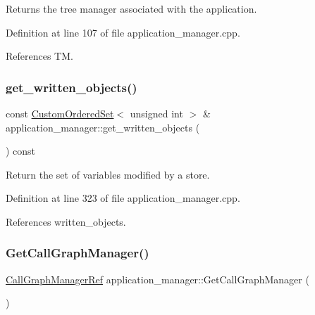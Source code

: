 Returns the tree manager associated with the application. 



Definition at line 107 of file application\+\_\+manager.\+cpp.



References TM.

\mbox{\label{classapplication__manager_a4990ab2af03c641da7b8dad08706208c}} 
\subsubsection{\texorpdfstring{get\+\_\+written\+\_\+objects()}{get\_written\_objects()}}
{\footnotesize\ttfamily const \hyperlink{classCustomOrderedSet}{Custom\+Ordered\+Set}$<$ unsigned int $>$ \& application\+\_\+manager\+::get\+\_\+written\+\_\+objects (\begin{DoxyParamCaption}{ }\end{DoxyParamCaption}) const}



Return the set of variables modified by a store. 



Definition at line 323 of file application\+\_\+manager.\+cpp.



References written\+\_\+objects.

\mbox{\label{classapplication__manager_a83151669989cf6192423d1e51fd54b3e}} 
\subsubsection{\texorpdfstring{Get\+Call\+Graph\+Manager()}{GetCallGraphManager()}}
{\footnotesize\ttfamily \hyperlink{call__graph__manager_8hpp_aefd741adcd456a04c45fd3df98acdb2c}{Call\+Graph\+Manager\+Ref} application\+\_\+manager\+::\+Get\+Call\+Graph\+Manager (\begin{DoxyParamCaption}{ }\end{DoxyParamCaption})}



